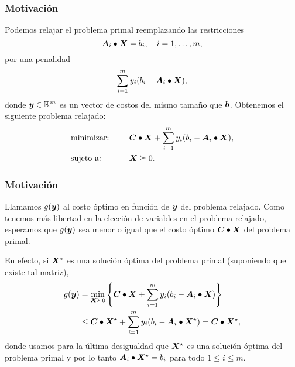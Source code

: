 \documentclass[aspectratio=169,12pt,spanish]{beamer}
\begin{document}

\begin{frame}
\frametitle{Motivación}

Podemos relajar el problema primal reemplazando las restricciones
$$\bm{A}_i \bullet \bm{X} = b_i, \quad i = 1, \dots, m,$$
por una penalidad $$\sum_{i=1}^m y_i (b_i - \bm{A}_i \bullet \bm{X}),$$
donde $\bm{y} \in \mathbb{R}^m$ es un vector de costos del mismo tamaño que $\bm{b}$. Obtenemos el siguiente problema relajado:
\begin{alignat*}{2}
  & \text{minimizar: } & & \bm{C} \bullet \bm{X} + \sum_{i=1}^m y_i (b_i - \bm{A}_i \bullet \bm{X}), \\
   & \text{sujeto a: } & \quad & \bm{X} \succeq 0.
\end{alignat*}


\end{frame}


\begin{frame}
\frametitle{Motivación}

Llamamos $g(\bm{y})$ al costo óptimo en función de $\bm{y}$ del problema relajado. Como tenemos más libertad en la elección de variables en el problema relajado, esperamos que $g(\bm{y})$ sea menor o igual que el costo óptimo $\bm{C} \bullet \bm{X}$ del problema primal.

En efecto, si $\bm{X}^\star$ es una solución óptima del problema primal (suponiendo que existe tal matriz),
$$
\begin{aligned}
g(\bm{y}) &= \min_{\bm{X} \succeq 0} \left\{ \bm{C} \bullet \bm{X} + \sum_{i=1}^m y_i (b_i - \bm{A}_i \bullet \bm{X}) \right\} \\
&\le \bm{C} \bullet \bm{X}^\star + \sum_{i=1}^m y_i (b_i - \bm{A}_i \bullet \bm{X}^\star) = \bm{C} \bullet \bm{X}^\star,
\end{aligned}
$$
donde usamos para la última desigualdad que $\bm{X}^\star$ es una solución óptima del problema primal y por lo tanto $\bm{A}_i \bullet \bm{X}^\star = b_i$ para todo $1 \le i \le m$.

\end{frame}

\end{document}
